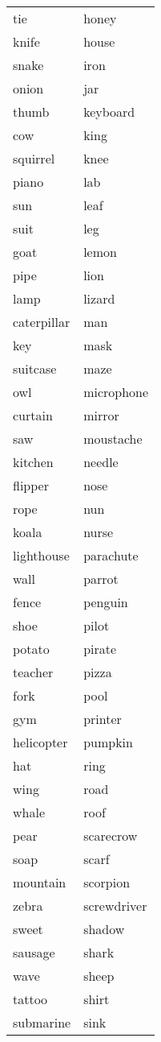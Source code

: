 \documentclass[
  man,floatsintext]{apa6}
\begin{document}
\begin{longtable}{ll}
tie & honey\\
knife & house\\
snake & iron\\
onion & jar\\
\addlinespace
thumb & keyboard\\
cow & king\\
squirrel & knee\\
piano & lab\\
sun & leaf\\
\addlinespace
suit & leg\\
goat & lemon\\
pipe & lion\\
lamp & lizard\\
caterpillar & man\\
\addlinespace
key & mask\\
suitcase & maze\\
owl & microphone\\
curtain & mirror\\
saw & moustache\\
\addlinespace
kitchen & needle\\
flipper & nose\\
rope & nun\\
koala & nurse\\
lighthouse & parachute\\
\addlinespace
wall & parrot\\
fence & penguin\\
shoe & pilot\\
potato & pirate\\
teacher & pizza\\
\addlinespace
fork & pool\\
gym & printer\\
helicopter & pumpkin\\
hat & ring\\
wing & road\\
\addlinespace
whale & roof\\
pear & scarecrow\\
soap & scarf\\
mountain & scorpion\\
zebra & screwdriver\\
\addlinespace
sweet & shadow\\
sausage & shark\\
wave & sheep\\
tattoo & shirt\\
submarine & sink\\

\end{longtable}
\end{document}
